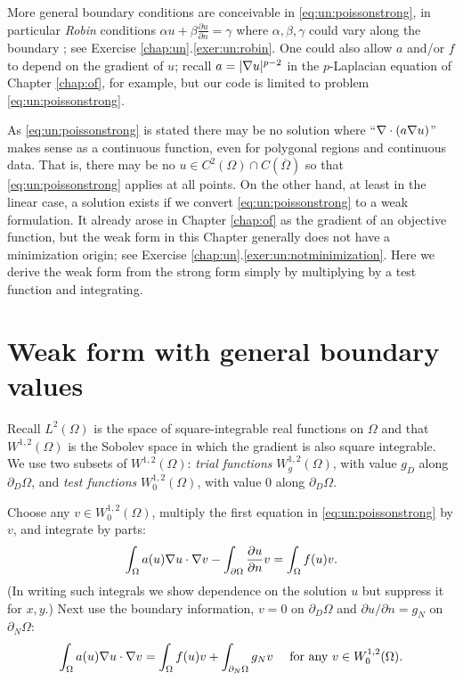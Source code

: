 More general boundary conditions are conceivable in \eqref{eq:un:poissonstrong}, in particular \emph{Robin} conditions $\alpha u + \beta \frac{\partial u}{\partial n} = \gamma$ where $\alpha,\beta,\gamma$ could vary along the boundary \citep{Elmanetal2005}; see Exercise \ref{chap:un}.\ref{exer:un:robin}.  One could also allow $a$ and/or $f$ to depend on the gradient of $u$; recall $a=|\nabla u|^{p-2}$ in the $p$-Laplacian equation of Chapter \ref{chap:of}, for example, but our code is limited to problem \eqref{eq:un:poissonstrong}.

As \eqref{eq:un:poissonstrong} is stated there may be no solution where ``$\nabla\cdot(a\nabla u)$'' makes sense as a continuous function, even for polygonal regions and continuous data.  That is, there may be no $u\in C^2(\Omega) \cap C(\overline \Omega)$ so that \eqref{eq:un:poissonstrong} applies at all points.  On the other hand, at least in the linear case, a solution exists if we convert \eqref{eq:un:poissonstrong} to a weak formulation.  It already arose in Chapter \ref{chap:of} as the gradient of an objective function, but the weak form in this Chapter generally does not have a minimization origin; see Exercise \ref{chap:un}.\ref{exer:un:notminimization}.  Here we derive the weak form from the strong form simply by multiplying by a test function and integrating.


\section{Weak form with general boundary values}

Recall $L^2(\Omega)$ is the space of square-integrable real functions on $\Omega$ and that $W^{1,2}(\Omega)$ is the Sobolev space in which the gradient is also square integrable.  We use two subsets of $W^{1,2}(\Omega)$: \emph{trial functions} $W^{1,2}_g(\Omega)$, with value $g_D$ along $\partial_D \Omega$, and \emph{test functions} $W^{1,2}_0(\Omega)$, with value $0$ along $\partial_D \Omega$.

Choose any $v\in W^{1,2}_0(\Omega)$, multiply the first equation in \eqref{eq:un:poissonstrong} by $v$, and integrate by parts:
\begin{equation*}
\int_\Omega a(u) \nabla u \cdot \nabla v - \int_{\partial\Omega} \frac{\partial u}{\partial n} v = \int_\Omega f(u) v.
\end{equation*}
(In writing such integrals we show dependence on the solution $u$ but suppress it for $x,y$.)  Next use the boundary information, $v=0$ on $\partial_D\Omega$ and $\partial u/\partial n=g_N$ on $\partial_N\Omega$:
\begin{equation}
\int_\Omega a(u) \nabla u \cdot \nabla v = \int_\Omega f(u) v + \int_{\partial_N\Omega} g_N v\quad \text{ for any } v\in W^{1,2}_0(\Omega). \label{eq:un:poissonweak}
\end{equation}


